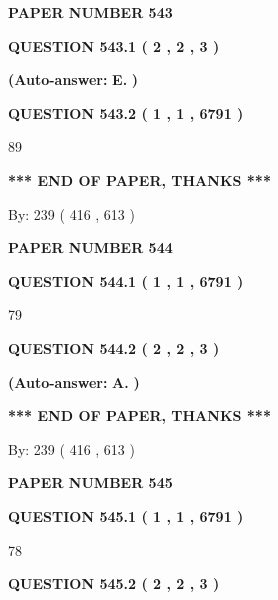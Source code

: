 \documentclass[12pt]{article}
\begin{document}
   
\newpage 
\setcounter{page}{ 
   543001 } 
   
   
 {\textbf{ \Large{ PAPER NUMBER  543  }}}
   
   
   
   
  
  
{\textbf{\large{QUESTION
543.1 
 ( 2 , 2 , 3 )
}}}
 
 
{\textbf{(Auto-answer:}}
{\textbf{\large{
E.}}}
{\textbf{)}}
 
 
  
  
{\textbf{\large{QUESTION
543.2 
 ( 1 , 1 , 6791 )
}}}

89
   
   
   
   
\vspace{1.0in} 
{\textbf{\large{ *** END OF PAPER, THANKS *** }}} 
   
   
\hspace{1.0in} By: 
 239 ( 416 ,  613 )
   
   
   
   
\newpage 
\setcounter{page}{ 
   544001 } 
   
   
 {\textbf{ \Large{ PAPER NUMBER  544  }}}
   
   
   
   
  
  
{\textbf{\large{QUESTION
544.1 
 ( 1 , 1 , 6791 )
}}}

79
  
  
{\textbf{\large{QUESTION
544.2 
 ( 2 , 2 , 3 )
}}}
 
 
{\textbf{(Auto-answer:}}
{\textbf{\large{
A.}}}
{\textbf{)}}
 
 
   
   
   
   
\vspace{1.0in} 
{\textbf{\large{ *** END OF PAPER, THANKS *** }}} 
   
   
\hspace{1.0in} By: 
 239 ( 416 ,  613 )
   
   
   
   
\newpage 
\setcounter{page}{ 
   545001 } 
   
   
 {\textbf{ \Large{ PAPER NUMBER  545  }}}
   
   
   
   
  
  
{\textbf{\large{QUESTION
545.1 
 ( 1 , 1 , 6791 )
}}}

78
  
  
{\textbf{\large{QUESTION
545.2 
 ( 2 , 2 , 3 )
}}}
 
\end{document}
